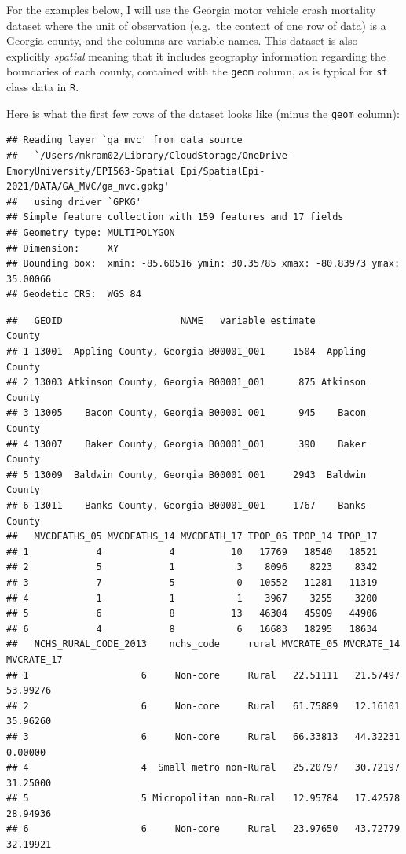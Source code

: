 \documentclass[
]{book}
\begin{document}
For the examples below, I will use the Georgia motor vehicle crash mortality dataset where the unit of observation (e.g.~the content of one row of data) is a Georgia county, and the columns are variable names. This dataset is also explicitly \emph{spatial} meaning that it includes geography information regarding the boundaries of each county, contained with the \texttt{geom} column, as is typical for \texttt{sf} class data in \texttt{R}.

Here is what the first few rows of the dataset looks like (minus the \texttt{geom} column):

\begin{verbatim}
## Reading layer `ga_mvc' from data source 
##   `/Users/mkram02/Library/CloudStorage/OneDrive-EmoryUniversity/EPI563-Spatial Epi/SpatialEpi-2021/DATA/GA_MVC/ga_mvc.gpkg' 
##   using driver `GPKG'
## Simple feature collection with 159 features and 17 fields
## Geometry type: MULTIPOLYGON
## Dimension:     XY
## Bounding box:  xmin: -85.60516 ymin: 30.35785 xmax: -80.83973 ymax: 35.00066
## Geodetic CRS:  WGS 84
\end{verbatim}

\begin{verbatim}
##   GEOID                     NAME   variable estimate          County
## 1 13001  Appling County, Georgia B00001_001     1504  Appling County
## 2 13003 Atkinson County, Georgia B00001_001      875 Atkinson County
## 3 13005    Bacon County, Georgia B00001_001      945    Bacon County
## 4 13007    Baker County, Georgia B00001_001      390    Baker County
## 5 13009  Baldwin County, Georgia B00001_001     2943  Baldwin County
## 6 13011    Banks County, Georgia B00001_001     1767    Banks County
##   MVCDEATHS_05 MVCDEATHS_14 MVCDEATH_17 TPOP_05 TPOP_14 TPOP_17
## 1            4            4          10   17769   18540   18521
## 2            5            1           3    8096    8223    8342
## 3            7            5           0   10552   11281   11319
## 4            1            1           1    3967    3255    3200
## 5            6            8          13   46304   45909   44906
## 6            4            8           6   16683   18295   18634
##   NCHS_RURAL_CODE_2013    nchs_code     rural MVCRATE_05 MVCRATE_14 MVCRATE_17
## 1                    6     Non-core     Rural   22.51111   21.57497   53.99276
## 2                    6     Non-core     Rural   61.75889   12.16101   35.96260
## 3                    6     Non-core     Rural   66.33813   44.32231    0.00000
## 4                    4  Small metro non-Rural   25.20797   30.72197   31.25000
## 5                    5 Micropolitan non-Rural   12.95784   17.42578   28.94936
## 6                    6     Non-core     Rural   23.97650   43.72779   32.19921
\end{verbatim}
\end{document}
